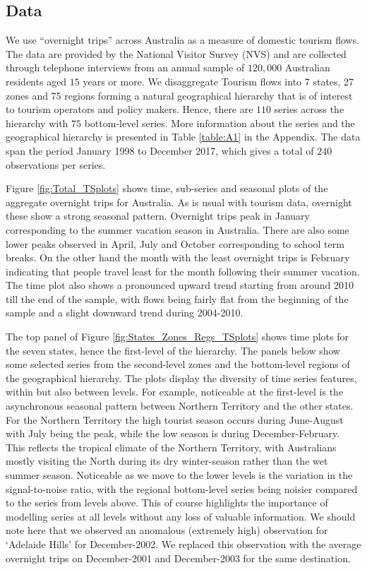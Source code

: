 \documentclass[12pt]{article}
\theoremstyle{definition}
\theoremstyle{property}
\begin{document}
	
	\subsection{Data}
	
	We use ``overnight trips'' across Australia as a measure of domestic tourism flows. The data are provided by the National Visitor Survey (NVS) and are collected through telephone interviews from an annual sample of $120,000$ Australian residents aged $15$ years or more. We disaggregate Tourism flows into 7 states, 27 zones and 75 regions forming a natural geographical hierarchy that is of interest to tourism operators and policy makers. Hence, there are $110$ series across the hierarchy with $75$ bottom-level series. More information about the series and the geographical hierarchy is presented in Table \ref{table:A1} in the Appendix. The data span the period January 1998 to December 2017, which gives a total of $240$ observations per series.

Figure \ref{fig:Total_TSplots} shows time, sub-series and seasonal plots of the aggregate overnight trips for Australia. As is usual with tourism data, overnight these show a strong seasonal pattern. Overnight trips peak in January corresponding to the summer vacation season in Australia. There are also some lower peaks observed in April, July and October corresponding to school term breaks. On the other hand the month with the least overnight trips is February indicating that people travel least for the month following their summer vacation. The time plot also shows a pronounced upward trend starting from around 2010 till the end of the sample, with flows being fairly flat from the beginning of the sample and a slight downward trend during 2004-2010.

The top panel of Figure \ref{fig:States_Zones_Regs_TSplots} shows time plots for the seven states, hence the first-level of the hierarchy. The panels below show some selected series from the second-level zones and the bottom-level regions of the geographical hierarchy. The plots display the diversity of time series features, within but also between levels. For example, noticeable at the first-level is the asynchronous seasonal pattern between Northern Territory and the other states. For the Northern Territory the high tourist season occurs during June-August with July being the peak, while the low season is during December-February. This reflects the tropical climate of the Northern Territory, with Australians mostly visiting the North during its dry winter-season rather than the wet summer season. Noticeable as we move to the lower levels is the variation in the signal-to-noise ratio, with the regional bottom-level series being noisier compared to the series from levels above. This of course highlights the importance of modelling series at all levels without any loss of valuable information. We should note here that we observed an anomalous (extremely high) observation for `Adelaide Hills' for December-2002. We replaced this observation with the average overnight trips on December-2001 and December-2003 for the same destination.
		
\end{document}
